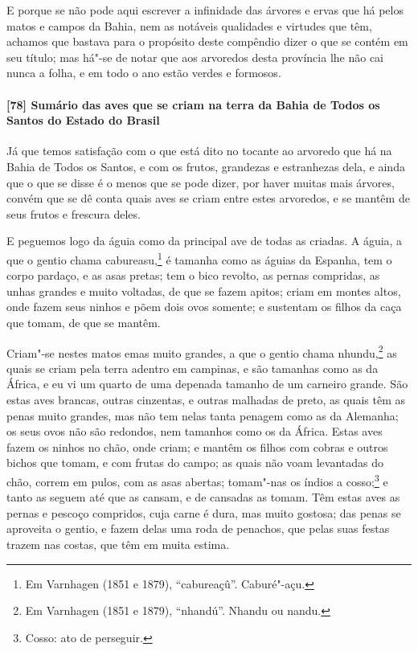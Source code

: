 \begin{linenumbers}
E porque se não pode aqui escrever a infinidade das árvores e ervas que há pelos matos e
campos da Bahia, nem as notáveis qualidades e virtudes que têm, achamos que bastava para o
propósito deste compêndio dizer o que se contém em seu título; mas há"-se de notar que aos
arvoredos desta província lhe não cai nunca a folha, e em todo o ano estão verdes e
formosos.

\paragraph{[78] Sumário das aves que se criam na terra da Bahia de Todos os Santos do Estado
do Brasil}\quad
Já que temos satisfação com o que está dito no tocante ao arvoredo que há na Bahia de
Todos os Santos, e com os frutos, grandezas e estranhezas dela, e ainda que o que se disse
é o menos que se pode dizer, por haver muitas mais árvores, convém que se dê conta quais
aves se criam entre estes arvoredos, e se mantêm de seus frutos e frescura deles.

E peguemos logo da águia como da principal ave de todas as criadas. A águia, a que o
gentio chama cabureasu,\footnote{ Em Varnhagen (1851 e 1879), ``cabureaçû''. Caburé"-açu.}
é tamanha como as águias da Espanha, tem o corpo pardaço, e as asas pretas; tem o bico
revolto, as pernas compridas, as unhas grandes e muito voltadas, de que se fazem apitos;
criam em montes altos, onde fazem seus ninhos e põem dois ovos somente; e sustentam os
filhos da caça que tomam, de que se mantêm.

Criam"-se nestes matos emas muito grandes, a que o gentio chama nhundu,\footnote{ Em
Varnhagen (1851 e 1879), ``nhandú''. Nhandu ou nandu.} as quais se criam pela terra
adentro em campinas, e são tamanhas como as da África, e eu vi um quarto de uma depenada
tamanho de um carneiro grande. São estas aves brancas, outras cinzentas, e outras malhadas
de preto, as quais têm as penas muito grandes, mas não tem nelas tanta penagem como as da
Alemanha; os seus ovos não são redondos, nem tamanhos como os da África. Estas aves fazem
os ninhos no chão, onde criam; e mantêm os filhos com cobras e outros bichos que tomam, e
com frutas do campo; as quais não voam levantadas do chão, correm em pulos, com as asas
abertas; tomam"-nas os índios a cosso;\footnote{ Cosso: ato de perseguir.} e tanto as
seguem até que as cansam, e de cansadas as tomam. Têm estas aves as pernas e
pescoço compridos, cuja carne é dura, mas muito gostosa; das penas se aproveita o gentio,
e fazem delas uma roda de penachos, que pelas suas festas trazem nas costas, que têm em
muita estima.


\end{linenumbers}
